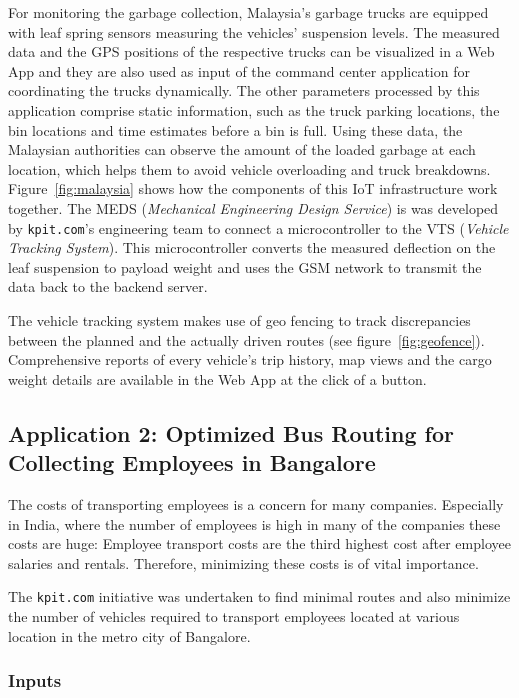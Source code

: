 \documentclass[10pt]{article}
\begin{document}
For monitoring the garbage collection, Malaysia's garbage trucks are equipped with  
leaf spring sensors measuring the vehicles' suspension levels. 
The measured data and the GPS positions of the respective trucks can be visualized 
in a Web App and they are also used as input of the 
command center application for coordinating the trucks dynamically. 
The other parameters processed by this 
application comprise static information, such as the truck parking locations,
the bin locations and time estimates before a bin is full. Using these data,
the Malaysian authorities can observe the amount of the loaded garbage at each 
location, which helps them to avoid vehicle overloading and truck breakdowns.
Figure~\ref{fig:malaysia} shows how the components of this IoT 
infrastructure work together. The MEDS ({\it Mechanical Engineering Design Service}) 
is was developed by {\tt kpit.com}'s engineering team to connect a microcontroller 
to the VTS ({\it Vehicle Tracking System}). This microcontroller 
converts the measured deflection on the leaf suspension to payload weight and uses 
the GSM network to transmit the data back to the backend server.

The vehicle tracking system makes use of geo fencing to track discrepancies between the
planned and the actually driven routes (see figure~\ref{fig:geofence}). 
Comprehensive reports of every vehicle's trip history, map views and the cargo 
weight details are available in the Web App at the click of a button.


\subsection{Application 2: Optimized Bus Routing for Collecting Employees in Bangalore}
\label{sec:Bangalore}

The costs of transporting employees is a concern for many companies. Especially in India, 
where the number of employees is high in many of the companies these costs are huge: 
Employee transport costs are the third highest cost after employee salaries and rentals.
Therefore, minimizing these costs is of vital importance.

The {\tt kpit.com} initiative was undertaken to find minimal routes and also minimize the
number of vehicles required to transport employees located at various location in the 
metro city of Bangalore.

\subsubsection*{Inputs}
\end{document}
